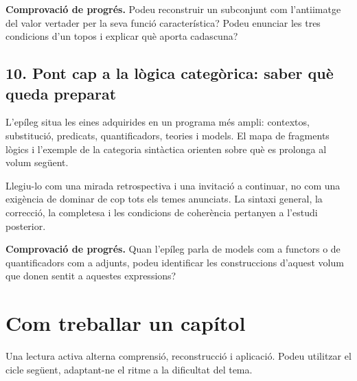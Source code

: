 \noindent\textbf{Comprovació de progrés.} Podeu reconstruir un
subconjunt com l'antiimatge del valor vertader per la
seva funció característica? Podeu enunciar les tres
condicions d'un topos i explicar què aporta cadascuna?

\subsection*{10. Pont cap a la lògica categòrica: saber què queda preparat}

L'epíleg situa les eines adquirides en un programa més ampli:
contextos, substitució, predicats, quantificadors, teories
i models. El mapa de fragments lògics i l'exemple de la
categoria sintàctica orienten sobre què es prolonga al
volum següent.

Llegiu-lo com una mirada retrospectiva i una invitació a
continuar, no com una exigència de dominar de cop tots els
temes anunciats. La sintaxi general, la correcció, la
completesa i les condicions de coherència pertanyen a
l'estudi posterior.

\noindent\textbf{Comprovació de progrés.} Quan l'epíleg parla de
models com a functors o de quantificadors com a adjunts,
podeu identificar les construccions d'aquest volum que
donen sentit a aquestes expressions?

\section{Com treballar un capítol}

Una lectura activa alterna comprensió, reconstrucció i aplicació.
Podeu utilitzar el cicle següent, adaptant-ne el ritme a la
dificultat del tema.

